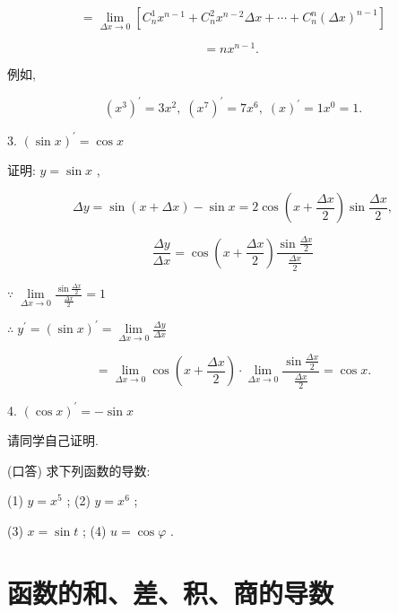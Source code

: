 \documentclass[lang=cn,newtx,10pt,scheme=chinese]{elegantbook}
\begin{document}
\[
= \mathop{\lim }\limits_{{{\Delta x} \rightarrow 0}}\left\lbrack {{C}_{n}^{1}{x}^{n - 1} + {C}_{n}^{2}{x}^{n - 2}{\Delta x} + \cdots + {C}_{n}^{n}{\left( \Delta x\right) }^{n - 1}}\right\rbrack
\]

\[
= n{x}^{n - 1}\text{. }
\]

例如,

\[
{\left( {x}^{3}\right) }^{\prime } = 3{x}^{2},\;{\left( {x}^{7}\right) }^{\prime } = 7{x}^{6},\;{\left( x\right) }^{\prime } = 1{x}^{0} = 1.
\]
\begin{conclusion}
	3. \({\left( \sin x\right) }^{\prime } = \cos x\)
\end{conclusion}

证明: \(y = \sin x\) ,

\[
{\Delta y} = \sin \left( {x + {\Delta x}}\right) - \sin x = 2\cos \left( {x + \frac{\Delta x}{2}}\right) \sin \frac{\Delta x}{2},
\]

\[
\frac{\Delta y}{\Delta x} = \cos \left( {x + \frac{\Delta x}{2}}\right) \frac{\sin \frac{\Delta x}{2}}{\frac{\Delta x}{2}}
\]

\(\because \;\mathop{\lim }\limits_{{{\Delta x} \rightarrow 0}}\frac{\sin \frac{\Delta x}{2}}{\frac{\Delta x}{2}} = 1\)

\(\therefore \;{y}^{\prime } = {\left( \sin x\right) }^{\prime } = \mathop{\lim }\limits_{{{\Delta x} \rightarrow 0}}\frac{\Delta y}{\Delta x}\)

\[
= \mathop{\lim }\limits_{{{\Delta x} \rightarrow 0}}\cos \left( {x + \frac{\Delta x}{2}}\right) \cdot \mathop{\lim }\limits_{{{\Delta x} \rightarrow 0}}\frac{\sin \frac{\Delta x}{2}}{\frac{\Delta x}{2}} = \cos x.
\]

\begin{conclusion}
	4. \({\left( \cos x\right) }^{\prime } = - \sin x\)
\end{conclusion}

请同学自己证明.

\begin{problemset}[练习]

\item (口答) 求下列函数的导数:

(1) \(y = {x}^{5}\) ; (2) \(y = {x}^{6}\) ;

(3) \(x = \sin t\) ; (4) \(u = \cos \varphi\) .

\end{problemset}

\section{函数的和、差、积、商的导数}
\end{document}
